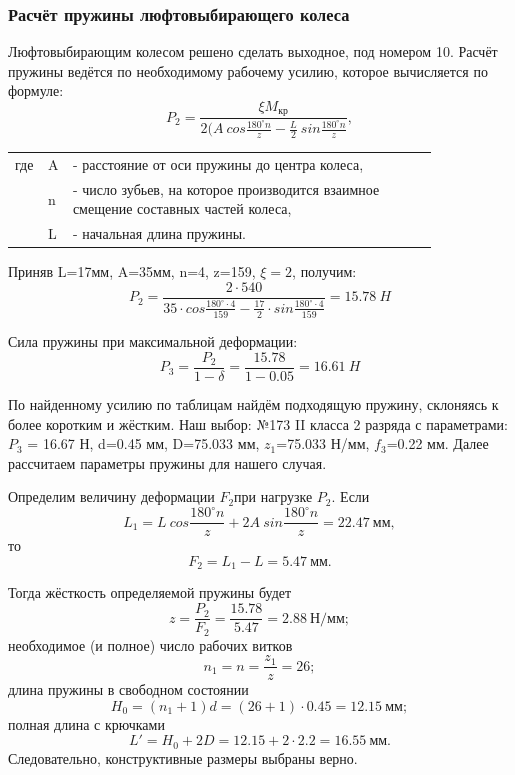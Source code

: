 \documentclass[14pt,a4paper,russian]{scrartcl}
\begin{document}
    \subsubsection{Расчёт пружины люфтовыбирающего колеса}
        Люфтовыбирающим колесом решено сделать выходное, под номером 10.
        Расчёт пружины ведётся по необходимому рабочему усилию, которое
        вычисляется по формуле:
        \[ P_2 = \frac{\xi M_{\text{кр}}}{2(A\ cos\frac{180^\circ n}{z}
                - \frac{L}{2}\ sin\frac{180^\circ n}{z}},\]
        \begin{table}[h!]
            \begin{center}
                \begin{tabular}{p{0.025\linewidth}p{0.01\linewidth}p{0.8\linewidth}}
                    где & A & - расстояние от оси пружины до центра колеса,\\
                    & n & - число зубьев, на которое производится взаимное смещение составных частей колеса,\\
                    & L & - начальная длина пружины.
                \end{tabular}
            \end{center}
        \end{table}

        Приняв L=17мм, A=35мм, n=4, 
        z=159, \( \xi=2 \), получим:
        \[ P_2 = \frac{2\cdot540}{35\cdot cos\frac{180^\circ\cdot4}{159}
                - \frac{17}{2}\cdot sin\frac{180^\circ\cdot4}{159}} = 15.78\ H\]
        
        Сила пружины при максимальной деформации:
        \[ P_3 = \frac{P_2}{1-\delta} = \frac{15.78}{1-0.05} = 16.61\ H\]

        По найденному усилию по таблицам найдём подходящую пружину, склоняясь к более коротким
        и жёстким. Наш выбор: №173 II класса 2 разряда с параметрами: \( P_3 \) = 16.67 Н, d=0.45 мм, 
        D=75.033 мм, \( z_1 \)=75.033 Н/мм, \( f_3 \)=0.22 мм. Далее рассчитаем параметры
        пружины для нашего случая.

        Определим величину деформации \( F_2 \)при нагрузке \( P_2 \). Если 
        \[ L_1 =  L\ cos\frac{180^\circ n}{z} + 2A\ sin\frac{180^\circ n}{z} = 22.47\ \text{мм},\]
        то 
        \[ F_2 = L_1 - L = 5.47\ \text{мм}.\]

        Тогда жёсткость определяемой пружины будет
        \[ z = \frac{P_2}{F_2} = \frac{15.78}{5.47} = 2.88\ \text{Н/мм}; \]
        необходимое (и полное) число рабочих витков
        \[ n_1 = n = \frac{z_1}{z} = 26;\]
        длина пружины в свободном состоянии
        \[ H_0 = (n_1 + 1)d = (26 + 1)\cdot 0.45= 12.15\ \text{мм}; \]
        полная длина с крючками
        \[ L' = H_0 + 2D = 12.15 + 2\cdot 2.2 = 16.55\ \text{мм}. \]
        Следовательно, конструктивные размеры выбраны верно.
\end{document}
